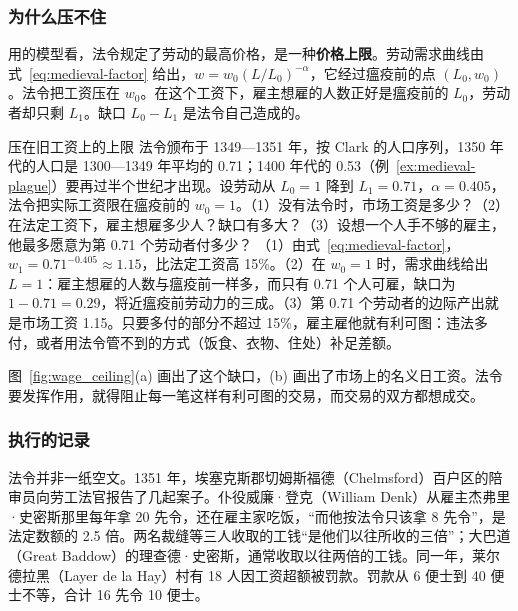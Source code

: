 \subsubsection{为什么压不住}
用的模型看，法令规定了劳动的最高价格，是一种\textbf{价格上限}。劳动需求曲线由式~\eqref{eq:medieval-factor} 给出，$w=w_0(L/L_0)^{-\alpha}$，它经过瘟疫前的点 $(L_0,w_0)$。法令把工资压在 $w_0$。在这个工资下，雇主想雇的人数正好是瘟疫前的 $L_0$，劳动者却只剩 $L_1$。缺口 $L_0-L_1$ 是法令自己造成的。

\begin{example}{压在旧工资上的上限}\label{ex:medieval-ceiling}
法令颁布于 1349—1351 年，按 Clark 的人口序列，1350 年代的人口是 1300—1349 年平均的 0.71；1400 年代的 0.53（例~\ref{ex:medieval-plague}）要再过半个世纪才出现。设劳动从 $L_0=1$ 降到 $L_1=0.71$，$\alpha=0.405$，法令把实际工资限在瘟疫前的 $w_0=1$。（1）没有法令时，市场工资是多少？（2）在法定工资下，雇主想雇多少人？缺口有多大？（3）设想一个人手不够的雇主，他最多愿意为第 0.71 个劳动者付多少？
\solution （1）由式~\eqref{eq:medieval-factor}，$w_1=0.71^{-0.405}\approx1.15$，比法定工资高 15\%。（2）在 $w_0=1$ 时，需求曲线给出 $L=1$：雇主想雇的人数与瘟疫前一样多，而只有 0.71 个人可雇，缺口为 $1-0.71=0.29$，将近瘟疫前劳动力的三成。（3）第 0.71 个劳动者的边际产出就是市场工资 1.15。只要多付的部分不超过 15\%，雇主雇他就有利可图：违法多付，或者用法令管不到的方式（饭食、衣物、住处）补足差额。
\end{example}

图~\ref{fig:wage_ceiling}(a) 画出了这个缺口，(b) 画出了市场上的名义日工资。法令要发挥作用，就得阻止每一笔这样有利可图的交易，而交易的双方都想成交。


\subsubsection{执行的记录}
法令并非一纸空文。1351 年，埃塞克斯郡切姆斯福德（Chelmsford）百户区的陪审员向劳工法官报告了几起案子。仆役威廉·登克（William Denk）从雇主杰弗里·史密斯那里每年拿 20 先令，还在雇主家吃饭，“而他按法令只该拿 8 先令”，是法定数额的 2.5 倍。两名裁缝等三人收取的工钱“是他们以往所收的三倍”；大巴道（Great Baddow）的理查德·史密斯，通常收取以往两倍的工钱\cite{bbt1914}。同一年，莱尔德拉黑（Layer de la Hay）村有 18 人因工资超额被罚款。罚款从 6 便士到 40 便士不等，合计 16 先令 10 便士\cite{bbt1914}。

